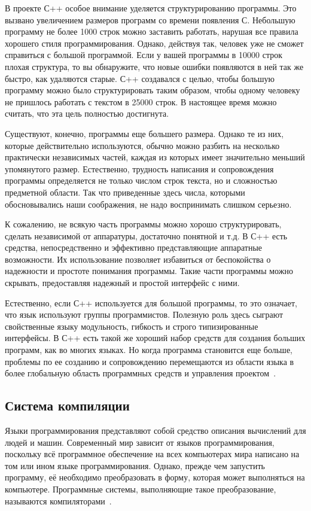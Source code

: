 В проекте С++ особое внимание уделяется структурированию программы. Это вызвано увеличением размеров программ со времени появления С. Небольшую программу не более 1000 строк можно заставить работать, нарушая все правила хорошего стиля программирования. Однако, действуя так, человек уже не сможет справиться с большой программой. Если у вашей программы в 10000 строк плохая структура, то вы обнаружите, что новые ошибки появляются в ней так же быстро, как удаляются старые. С++ создавался с целью, чтобы большую программу можно было структурировать таким образом, чтобы одному человеку не пришлось работать с текстом в 25000 строк. В настоящее время можно считать, что эта цель полностью достигнута.

Существуют, конечно, программы еще большего размера. Однако те из них, которые действительно используются, обычно можно разбить на несколько практически независимых частей, каждая из которых имеет значительно меньший упомянутого размер. Естественно, трудность написания и сопровождения программы определяется не только числом строк текста, но и сложностью предметной области. Так что приведенные здесь числа, которыми обосновывались наши соображения, не надо воспринимать слишком серьезно.

К сожалению, не всякую часть программы можно хорошо структурировать, сделать независимой от аппаратуры, достаточно понятной и т.д. В С++ есть средства, непосредственно и эффективно представляющие аппаратные возможности. Их использование позволяет избавиться от беспокойства о надежности и простоте понимания программы. Такие части программы можно скрывать, предоставляя надежный и простой интерфейс с ними.

Естественно, если С++ используется для большой программы, то это означает, что язык используют группы программистов. Полезную роль здесь сыграют свойственные языку модульность, гибкость и строго типизированные интерфейсы. В С++ есть такой же хороший набор средств для создания больших программ, как во многих языках. Но когда программа становится еще больше, проблемы по ее созданию и сопровождению перемещаются из области языка в более глобальную область программных средств и управления проектом~\cite{StroustrupCpp}.


\subsection{Система компиляции}

Языки программирования представляют собой средство описания вычислений для людей и машин. Современный мир зависит от языков программирования, поскольку всё программное обеспечение на всех компьютерах мира написано на том или ином языке программирования. Однако, прежде чем запустить программу, её необходимо преобразовать в форму, которая может выполняться на компьютере.
Программные системы, выполняющие такое преобразование, называются компиляторами~\cite{Dragon}.

